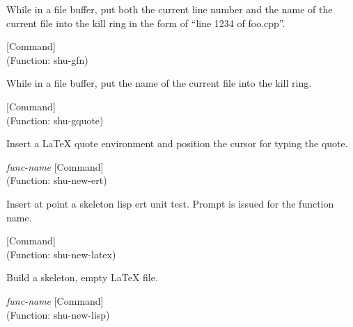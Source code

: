 \begin{doc-string}
While in a file buffer, put both the current line number and the name of the current
file into the kill ring in the form of ``line 1234 of foo.cpp''.
\end{doc-string}

\vspace{1em}
\noindent
{}
\usebox{\funcname}
 \hfill [Command]\\%
 (Function: shu-gfn)

\begin{doc-string}
While in a file buffer, put the name of the current file into the kill ring.
\end{doc-string}

\vspace{1em}
\noindent
{}
\usebox{\funcname}
 \hfill [Command]\\%
 (Function: shu-gquote)

\begin{doc-string}
Insert a LaTeX quote environment and position the cursor for typing the quote.
\end{doc-string}

\vspace{1em}
\noindent
{}
\usebox{\funcname}\emph{func-name}
 \hfill [Command]\\%
 (Function: shu-new-ert)

\begin{doc-string}
Insert at point a skeleton lisp ert unit test.  Prompt is issued for the
function name.
\end{doc-string}

\vspace{1em}
\noindent
{}
\usebox{\funcname}
 \hfill [Command]\\%
 (Function: shu-new-latex)

\begin{doc-string}
Build a skeleton, empty LaTeX file.
\end{doc-string}

\vspace{1em}
\noindent
{}
\usebox{\funcname}\emph{func-name}
 \hfill [Command]\\%
 (Function: shu-new-lisp)

